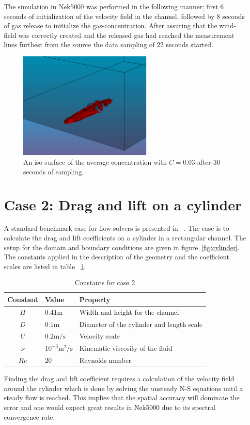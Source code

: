 The simulation in Nek5000 was performed in the following manner; first 6 seconds of initialization of the velocity field in the 
channel, followed by 8 seconds of gas release to initialize the gas-concentration. After assuring that the wind-field was 
correctly created and the released gas had reached the measurement lines furthest from the source the data sampling of 22 seconds 
started.
%
\begin{figure}[h]
	\centering
	\includegraphics[width=0.6\textwidth]{Figures/plume.png}
	\caption{An iso-surface of the average concentration with $C=0.03$ 
    after 30 seconds of sampling.}
	\label{fig:plume}
\end{figure}
%

\section{Case 2: Drag and lift on a cylinder}
A standard benchmark case for flow solvers is presented in ~\cite{benchmark}. 
The case is to calculate the drag and lift coefficients on a cylinder in a rectangular channel.
The setup for the domain and boundary conditions are given in figure~\ref{fig:cylinder}.
The constants applied in the description of the geometry and the coefficient scales are listed 
in table ~\ref{tab:case2consts}.
%
\begin{table}[h]
    \centering
    \begin{tabular}{c l l}
     Constant & Value & Property \\ \hline
    $H$ & $0.41\text{m}$ & Width and height for the channel \\
    $D$ & $0.1\text{m}$ & Diameter of the cylinder and length scale \\
    $U$ & $0.2\text{m/s}$ & Velocity scale \\
    $\nu$ &  $ 10^{-3}\text{m$^2$/s}$ & Kinematic viscosity of the fluid \\
    $Re$ & $20$ & Reynolds number \\ 
    \end{tabular}
    \caption{Constants for case 2}
    \label{tab:case2consts}
\end{table}
%
Finding the drag and lift coefficient requires a calculation of the velocity field around the cylinder
which is done by solving the unsteady N-S equations until a steady flow is reached. This implies that the
spatial accuracy will dominate the error and one would expect great results in Nek5000 
due to its spectral convergence rate.

